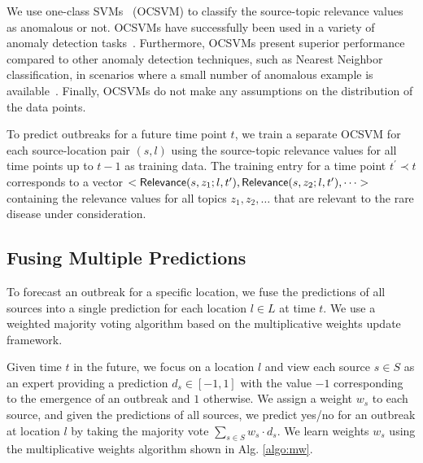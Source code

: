 \documentclass[twoside,leqno,twocolumn]{article}
\begin{document}
We use one-class SVMs~\cite{schoelkopf:99} (OCSVM) to classify the source-topic relevance values as anomalous or not. OCSVMs have successfully been used in a variety of anomaly detection tasks~\cite{manevitz:2002, heller:03,steinwart:05}. Furthermore, OCSVMs present superior performance compared to other anomaly detection techniques, such as Nearest Neighbor classification, in scenarios where a small number of anomalous example is available~\cite{khan:13}. Finally, OCSVMs do not make any assumptions on the distribution of the data points.


To predict outbreaks for a future time point $t$, we train a separate OCSVM for each source-location pair $(s, l)$ using the source-topic relevance values for all time points up to $t-1$ as training data.  The training entry for a time point $t^{\prime} \prec t$ corresponds to a vector $<{\sf Relevance}(s,z_1;l,t^{\prime}), {\sf Relevance}(s,z_2;l,t^{\prime}), \dots>$ containing the relevance values for all topics $z_1, z_2, \dots$ that are relevant to the rare disease under consideration. 

\subsection{Fusing Multiple Predictions}
\label{sec:integration}
To forecast an outbreak for a specific location, we fuse the predictions of all sources into a single prediction for each location $l \in L$ at time $t$. We use a weighted majority voting algorithm based on the multiplicative weights update framework\cite{arora:2012}.

Given time $t$ in the future, we focus on a location $l$ and view each source $s \in S$ as an expert providing a prediction $d_s \in [-1,1]$ with the value $-1$ corresponding to the emergence of an outbreak and $1$ otherwise. We assign a weight $w_s$ to each source, and given the predictions of all sources, we predict yes/no for an outbreak at location $l$ by taking the majority vote $\sum_{s \in S} w_s \cdot d_s$.  We learn weights $w_s$ using the multiplicative weights algorithm shown in Alg. \ref{algo:mw}.
\end{document}
